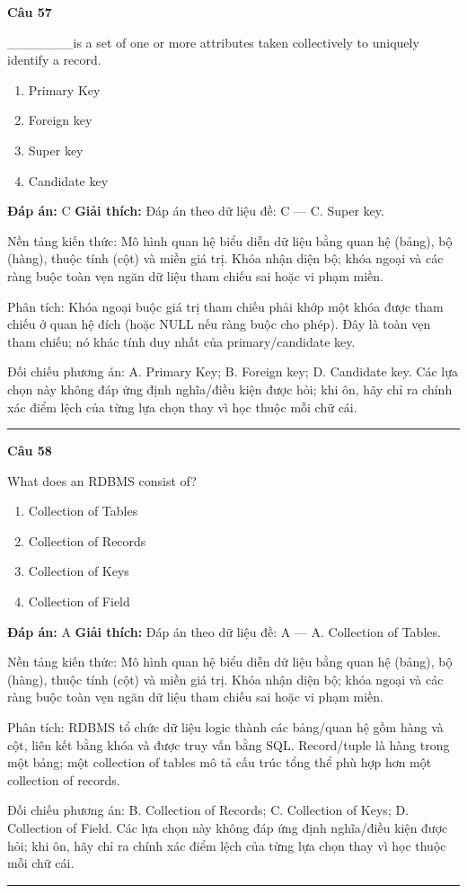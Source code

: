 \documentclass[11pt,a4paper]{article}
\newenvironment{question}[1]{%
  \par\vspace{1em}\noindent\textbf{\large Câu #1}\par\vspace{0.4em}
}{%
  \par\vspace{1em}\hrule\vspace{0.6em}
}
\newenvironment{choices}{%
  \begin{enumerate}[label=\textbf{\Alph*.},leftmargin=2.2em,itemsep=2pt,topsep=3pt]
}{%
  \end{enumerate}
}
\newcommand{\choice}{\item}
\begin{document}
\begin{question}{57}
_______is a set of one or more attributes taken collectively to uniquely identify a record.
\begin{choices}
\choice Primary Key
\choice Foreign key
\choice Super key
\choice Candidate key
\end{choices}
\textbf{Đáp án:} C
\textbf{Giải thích:} Đáp án theo dữ liệu đề: C — C. Super key.

Nền tảng kiến thức: Mô hình quan hệ biểu diễn dữ liệu bằng quan hệ (bảng), bộ (hàng), thuộc tính (cột) và miền giá trị. Khóa nhận diện bộ; khóa ngoại và các ràng buộc toàn vẹn ngăn dữ liệu tham chiếu sai hoặc vi phạm miền.

Phân tích: Khóa ngoại buộc giá trị tham chiếu phải khớp một khóa được tham chiếu ở quan hệ đích (hoặc NULL nếu ràng buộc cho phép). Đây là toàn vẹn tham chiếu; nó khác tính duy nhất của primary/candidate key.

Đối chiếu phương án: A. Primary Key; B. Foreign key; D. Candidate key. Các lựa chọn này không đáp ứng định nghĩa/điều kiện được hỏi; khi ôn, hãy chỉ ra chính xác điểm lệch của từng lựa chọn thay vì học thuộc mỗi chữ cái.
\end{question}

\begin{question}{58}
What does an RDBMS consist of?
\begin{choices}
\choice Collection of Tables
\choice Collection of Records
\choice Collection of Keys
\choice Collection of Field
\end{choices}
\textbf{Đáp án:} A
\textbf{Giải thích:} Đáp án theo dữ liệu đề: A — A. Collection of Tables.

Nền tảng kiến thức: Mô hình quan hệ biểu diễn dữ liệu bằng quan hệ (bảng), bộ (hàng), thuộc tính (cột) và miền giá trị. Khóa nhận diện bộ; khóa ngoại và các ràng buộc toàn vẹn ngăn dữ liệu tham chiếu sai hoặc vi phạm miền.

Phân tích: RDBMS tổ chức dữ liệu logic thành các bảng/quan hệ gồm hàng và cột, liên kết bằng khóa và được truy vấn bằng SQL. Record/tuple là hàng trong một bảng; một collection of tables mô tả cấu trúc tổng thể phù hợp hơn một collection of records.

Đối chiếu phương án: B. Collection of Records; C. Collection of Keys; D. Collection of Field. Các lựa chọn này không đáp ứng định nghĩa/điều kiện được hỏi; khi ôn, hãy chỉ ra chính xác điểm lệch của từng lựa chọn thay vì học thuộc mỗi chữ cái.
\end{question}
\end{document}
